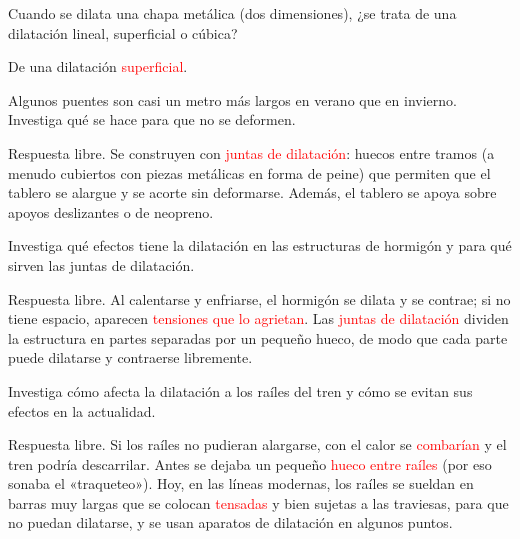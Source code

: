\begin{exercise}
    Cuando se dilata una chapa metálica (dos dimensiones), ¿se trata de una dilatación lineal, superficial o cúbica?
    \begin{solu}
        De una dilatación \textcolor{red}{superficial}.
    \end{solu}
\end{exercise}

\begin{exercise}
    Algunos puentes son casi un metro más largos en verano que en invierno. Investiga qué se hace para que no se deformen.
    \begin{solu}
        Respuesta libre. Se construyen con \textcolor{red}{juntas de dilatación}: huecos entre tramos (a menudo cubiertos con piezas metálicas en forma de peine) que permiten que el tablero se alargue y se acorte sin deformarse. Además, el tablero se apoya sobre apoyos deslizantes o de neopreno.
    \end{solu}
\end{exercise}

\begin{exercise}
    Investiga qué efectos tiene la dilatación en las estructuras de hormigón y para qué sirven las juntas de dilatación.
    \begin{solu}
        Respuesta libre. Al calentarse y enfriarse, el hormigón se dilata y se contrae; si no tiene espacio, aparecen \textcolor{red}{tensiones que lo agrietan}. Las \textcolor{red}{juntas de dilatación} dividen la estructura en partes separadas por un pequeño hueco, de modo que cada parte puede dilatarse y contraerse libremente.
    \end{solu}
\end{exercise}

\begin{exercise}
    Investiga cómo afecta la dilatación a los raíles del tren y cómo se evitan sus efectos en la actualidad.
    \begin{solu}
        Respuesta libre. Si los raíles no pudieran alargarse, con el calor se \textcolor{red}{combarían} y el tren podría descarrilar. Antes se dejaba un pequeño \textcolor{red}{hueco entre raíles} (por eso sonaba el «traqueteo»). Hoy, en las líneas modernas, los raíles se sueldan en barras muy largas que se colocan \textcolor{red}{tensadas} y bien sujetas a las traviesas, para que no puedan dilatarse, y se usan aparatos de dilatación en algunos puntos.
    \end{solu}
\end{exercise}

